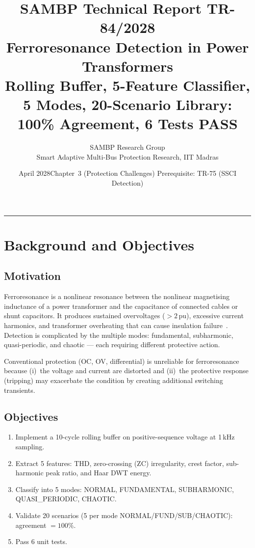 \documentclass[11pt, a4paper]{article}
\title{\textbf{\textsf{\color{sambpblue}SAMBP Technical Report TR-84/2028}}\\[6pt]
  \Large Ferroresonance Detection in Power Transformers\\[4pt]
  \normalsize Rolling Buffer, 5-Feature Classifier, 5 Modes,
  20-Scenario Library: 100\% Agreement, 6 Tests PASS}
\author{SAMBP Research Group\\[2pt]
  \small Smart Adaptive Multi-Bus Protection Research, IIT Madras}
\date{April 2028\quad\textbar\quad Chapter~3 (Protection Challenges)\quad\textbar\quad
  Prerequisite: TR-75 (SSCI Detection)}
\newcommand{\pu}{\,\text{pu}}
\begin{document}
\maketitle
\tableofcontents
\vspace{6pt}\hrule\vspace{10pt}

\section{Background and Objectives}
\label{sec:background}

\subsection{Motivation}

Ferroresonance is a nonlinear resonance between the nonlinear magnetising
inductance of a power transformer and the capacitance of connected cables
or shunt capacitors. It produces sustained overvoltages ($> 2\pu$),
excessive current harmonics, and transformer overheating that can
cause insulation failure~\cite{Arjun2020}. Detection is complicated
by the multiple modes: fundamental, subharmonic, quasi-periodic, and
chaotic --- each requiring different protective action.

Conventional protection (OC, OV, differential) is unreliable for
ferroresonance because (i)~the voltage and current are distorted and
(ii)~the protective response (tripping) may exacerbate the condition
by creating additional switching transients.

\subsection{Objectives}

\begin{enumerate}
  \item Implement a 10-cycle rolling buffer on positive-sequence voltage
    at 1\,kHz sampling.
  \item Extract 5 features: THD, zero-crossing (ZC) irregularity,
    crest factor, sub-harmonic peak ratio, and Haar DWT energy.
  \item Classify into 5 modes: NORMAL, FUNDAMENTAL, SUBHARMONIC,
    QUASI\_PERIODIC, CHAOTIC.
  \item Validate 20 scenarios (5 per mode NORMAL/FUND/SUB/CHAOTIC):
    agreement $= 100\%$.
  \item Pass 6 unit tests.
\end{enumerate}
\end{document}
